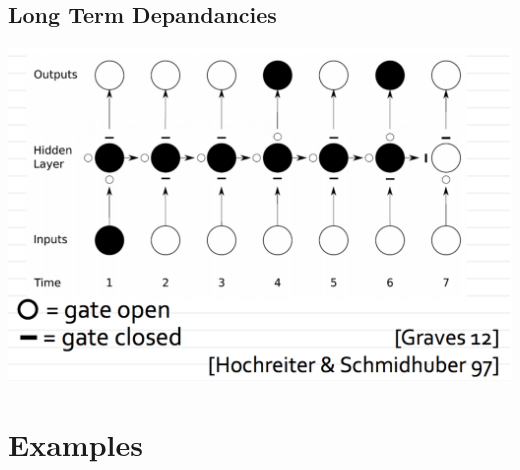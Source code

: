 \documentclass{beamer}
\begin{document}
	
	\subsection*{Long Term Depandancies}
	\begin{frame}
		
		\begin{center}
			\includegraphics[scale=0.3]{img/van}
		\end{center}					
	\end{frame}
	
	\section*{Examples}
\end{document}
